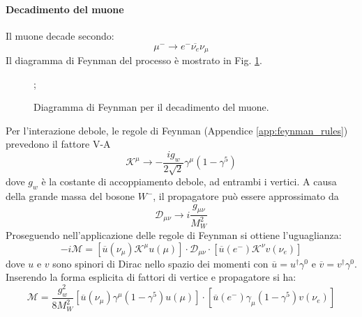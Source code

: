 \documentclass{subnucbo}
\begin{document}
\paragraph{Decadimento del muone} Il muone decade secondo:
\begin{equation}
        \mu^{-} \rightarrow e^{-} \overline{\nu_{e}} \nu_{\mu}
        \label{eq:muon_decay}
\end{equation}
Il diagramma di Feynman del processo è mostrato in Fig. \ref{fig:muon_decay}.
\begin{figure}[!h]
        \centering
        ;
        \caption{Diagramma di Feynman per il decadimento del muone.}
        \label{fig:muon_decay}
\end{figure}
Per l'interazione debole, le regole di Feynman (Appendice \ref{app:feynman_rules}) prevedono il fattore V-A
\begin{equation}
        \mathcal { K } ^ { \mu } \rightarrow - \frac { i g _ { w } } { 2 \sqrt { 2 } } \gamma ^ { \mu } \left( 1 - \gamma ^ { 5 } \right)
\end{equation}
dove $g_{w}$ è la costante di accoppiamento debole, ad entrambi i vertici. A causa della grande massa del bosone $W^{-}$, il propagatore può essere approssimato da
\begin{equation}
         \mathcal { D } _ { \mu \nu } \rightarrow i \frac { g _ { \mu \nu } } { M _ { W } ^ { 2 } }
        \label{eq:propagator}
\end{equation}
Proseguendo nell'applicazione delle regole di Feynman si ottiene l'uguaglianza:
\begin{equation}
        - i \mathcal { M } = \left[ \overline { u } \left( \nu _ { \mu } \right) \mathcal { K } ^ { \mu } u \left( \mu \right) \right] \cdot \mathcal { D } _ { \mu \nu } \cdot \left[ \overline { u } \left( e^{-} \right) \mathcal { K } ^ { \nu } v \left( \nu _ { e } \right) \right]
\end{equation}
dove $u$ e $v$ sono spinori di Dirac nello spazio dei momenti con $\overline { u } = u ^ { \dagger } \gamma ^ { 0 }$ e $\overline { v } = v ^ { \dagger } \gamma ^ { 0 }$. Inserendo la forma esplicita di fattori di vertice e propagatore si ha:
\begin{equation}
        \mathcal { M } = \frac { g _ { w } ^ { 2 } } { 8 M _ { W } ^ { 2 } } \left[ \overline { u } \left( \nu _ { \mu } \right) \gamma ^ { \mu } \left( 1 - \gamma ^ { 5 } \right) u ( \mu ) \right] \cdot \left[ \overline { u } \left( e ^ { - } \right) \gamma _ { \mu } \left( 1 - \gamma ^ { 5 } \right) v \left( \nu _ { e } \right) \right]
        \label{eq:amplitude_muon}
\end{equation}
\end{document}
